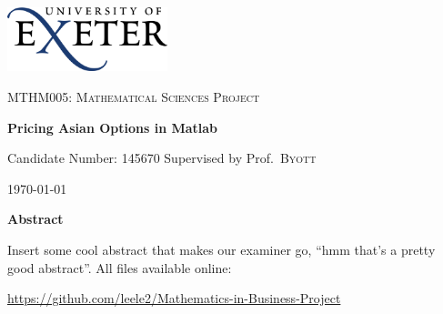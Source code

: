 \begin{titlepage}
	\centering
	\includegraphics[width=0.35\textwidth]{Title/logo.png} \par
	\vspace{0.25cm}
	{\scshape\Large MTHM005: Mathematical Sciences Project\par}
	\vspace{0.5cm}
	{\huge\bfseries Pricing Asian Options in Matlab\par}
    \vspace{0.10cm}
	{\Large Candidate Number: 145670}
	\vspace{0.2cm}
	\flushleft{}
	Supervised by	Prof.~\textsc{Byott} \hfill	{\large \today\par}
    \par
    \centering
	{\large \textbf{Abstract}}
	\par
    \lipsum[1]
    Insert some cool abstract that makes our examiner go, ``hmm that's a pretty good abstract''.
    \vfill
    All files available online: \par \small{\url{https://github.com/leele2/Mathematics-in-Business-Project}}
\end{titlepage}